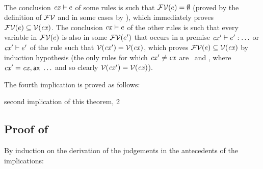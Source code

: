 \begin{bycase}
\Case{\Rthsub}
\begin{derivation}
\steP{\efvar{\app{\tspred}{\expr}}=\efvar{\tspred}\cup\efvar{\expr}}
\step{\hastyO{\expr}{\typ}}{\premof{\Rthsub}}
\end{derivation}

\Case{\restrules}\\
The conclusion $\mathit{cx}\vdash e$ of some rules is such that
$\mathcal{FV}(e)=\emptyset$ (proved by the definition of $\mathcal{FV}$ and in some
cases by ), which immediately proves
$\mathcal{FV}(e)\subseteq\mathcal{V}(\mathit{cx})$. The conclusion $\mathit{cx}\vdash e$ of the
other rules is such that every variable in $\mathcal{FV}(e)$ is also in some
$\mathcal{FV}(e')$ that occurs in a premise $\mathit{cx}'\vdash e':\ldots$ or
$\mathit{cx}'\vdash e'$ of the rule such that $\mathcal{V}(\mathit{cx}')=\mathcal{V}(\mathit{cx})$, which
proves $\mathcal{FV}(e)\subseteq\mathcal{V}(\mathit{cx})$ by induction hypothesis (the only rules
for which $\mathit{cx}'\neq\mathit{cx}$ are \Rthifsbs\ and \Rthif, where
$\mathit{cx}'=\mathit{cx},\mathsf{ax}\ \ldots$ and so clearly $\mathcal{V}(\mathit{cx}')=\mathcal{V}(\mathit{cx})$).

\end{bycase}

The fourth implication is proved as follows:
\begin{derivation}
     {second implication of this theorem, 2}
\end{derivation}



\subsection*{Proof of }

By induction on the derivation of the judgements in the antecedents of the
implications:

